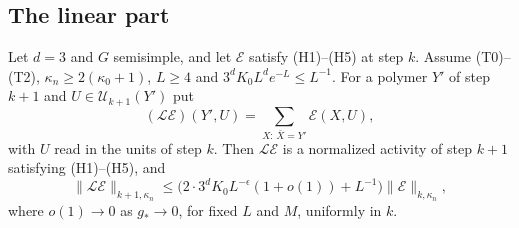 \subsection{The linear part}\label{subsec:flow-linear}

\begin{proposition}\label{prop:linear}
Let $d=3$ and $G$ semisimple, and let $\mathcal E$ satisfy (H1)--(H5) at step $k$. Assume (T0)--(T2), $\kappa_n\ge2(\kappa_0+1)$, $L\ge4$ and $3^dK_0L^de^{-L}\le L^{-1}$. For a polymer $Y'$ of step $k+1$ and $U\in\mathcal U_{k+1}(Y')$ put
\[
(\mathcal L\mathcal E)(Y',U)=\sum_{X:\,\bar X=Y'}\mathcal E(X,U),
\]
with $U$ read in the units of step $k$. Then $\mathcal L\mathcal E$ is a normalized activity of step $k+1$ satisfying (H1)--(H5), and
\[
\|\mathcal L\mathcal E\|_{k+1,\kappa_n}\le\big(2\cdot3^dK_0L^{-\epsilon}(1+o(1))+L^{-1}\big)\|\mathcal E\|_{k,\kappa_n},
\]
where $o(1)\to0$ as $g_*\to0$, for fixed $L$ and $M$, uniformly in $k$.
\end{proposition}

